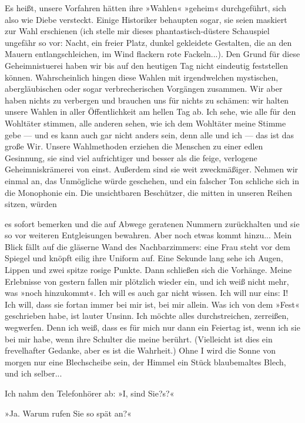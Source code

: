 Es heißt, unsere Vorfahren hätten ihre »Wahlen« »geheim«
durchgeführt, sich also wie Diebe versteckt. Einige Historiker
behaupten sogar, sie seien maskiert zur Wahl erschienen (ich stelle
mir dieses phantastisch-düstere Schauspiel ungefähr so vor: Nacht,
ein freier Platz, dunkel gekleidete Gestalten, die an den Mauern
entlangschleichen, im Wind flackern rote Fackeln...). Den Grund für
diese Geheimnistuerei haben wir bis auf den heutigen Tag nicht
eindeutig feststellen können. Wahrscheinlich hingen diese Wahlen
mit irgendwelchen mystischen, abergläubischen oder sogar
verbrecherischen Vorgängen zusammen. Wir aber haben nichts zu
verbergen und brauchen uns für nichts zu schämen: wir halten unsere
Wahlen in aller Öffentlichkeit am hellen Tag ab. Ich sehe, wie alle
für den Wohltäter stimmen, alle anderen sehen, wie ich dem
Wohltäter meine Stimme gebe — und es kann auch gar nicht anders
sein, denn alle und ich — das ist das große Wir. Unsere
Wahlmethoden erziehen die Menschen zu einer edlen Gesinnung, sie
sind viel aufrichtiger und besser als die feige, verlogene
Geheimniskrämerei von einst. Außerdem sind sie weit zweckmäßiger.
Nehmen wir einmal an, das Unmögliche würde geschehen, und ein
falscher Ton schliche sich in die Monophonie ein. Die unsichtbaren
Beschützer, die mitten in unseren Reihen sitzen, würden

es sofort bemerken und die auf Abwege geratenen Nummern
zurückhalten und sie so vor weiteren Entgleisungen bewahren. Aber
noch etwas kommt hinzu... Mein Blick fällt auf die gläserne Wand
des Nachbarzimmers: eine Frau steht vor dem Spiegel und knöpft
eilig ihre Uniform auf. Eine Sekunde lang sehe ich Augen, Lippen
und zwei spitze rosige Punkte. Dann schließen sich die Vorhänge.
Meine Erlebnisse von gestern fallen mir plötzlich wieder ein, und
ich weiß nicht mehr, was »noch hinzukommt«. Ich will es auch gar
nicht wissen. Ich will nur eins: I! Ich will, dass sie fortan immer
bei mir ist, bei mir allein. Was ich von dem »Fest« geschrieben
habe, ist lauter Unsinn. Ich möchte alles durchstreichen,
zerreißen, wegwerfen. Denn ich weiß, dass es für mich nur dann ein
Feiertag ist, wenn ich sie bei mir habe, wenn ihre Schulter die
meine berührt. (Vielleicht ist dies ein frevelhafter Gedanke, aber
es ist die Wahrheit.) Ohne I wird die Sonne von morgen nur eine
Blechscheibe sein, der Himmel ein Stück blaubemaltes Blech, und ich
selber...

Ich nahm den Telefonhörer ab: »I, sind Sie?s?«

»Ja. Warum rufen Sie so spät an?«


